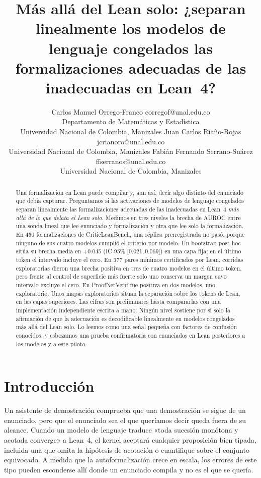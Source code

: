 \documentclass[10pt]{article}
\title{Más allá del Lean solo: ¿separan linealmente los modelos de lenguaje congelados las formalizaciones adecuadas de las inadecuadas en Lean~4?}
\author{\name Carlos Manuel Orrego-Franco \email corregof@unal.edu.co \\
      \addr Departamento de Matem\'aticas y Estad\'istica\\
      Universidad Nacional de Colombia, Manizales
      \AND
      \name Juan Carlos Ria\~no-Rojas \email jcrianoro@unal.edu.co \\
      \addr Universidad Nacional de Colombia, Manizales
      \AND
      \name Fabi\'an Fernando Serrano-Su\'arez \email ffserranos@unal.edu.co \\
      \addr Universidad Nacional de Colombia, Manizales}
\newcommand{\ic}[2]{[#1,\,#2]}
\begin{document}
\maketitle

\begin{abstract}
Una formalización en Lean puede compilar y, aun así, decir algo distinto del enunciado que debía capturar.
Preguntamos si las activaciones de modelos de lenguaje congelados separan linealmente las formalizaciones adecuadas
de las inadecuadas en Lean~4 \emph{más allá de lo que delata el Lean solo}. Medimos en tres niveles la brecha de
AUROC entre una sonda lineal que lee enunciado y formalización y otra que lee solo la formalización.
En 450 formalizaciones de CriticLeanBench, una réplica prerregistrada no pasó, porque ninguno de sus cuatro modelos
cumplió el criterio por modelo. Un bootstrap post hoc sitúa su brecha media en +0.045 (IC 95\% \ic{0.021}{0.069})
en una capa fija; en el último token el intervalo incluye el cero.
En 377 pares mínimos certificados por Lean, corridas exploratorias dieron una brecha positiva en tres de cuatro
modelos en el último token, pero frente al control de superficie más fuerte solo uno conserva un margen cuyo
intervalo excluye el cero.
En ProofNetVerif fue positiva en dos modelos, uno exploratorio.
Unos mapas exploratorios sitúan la separación sobre los tokens de Lean, en las capas superiores.
Las cifras son preliminares hasta compararlas con una implementación independiente escrita a mano.
Ningún nivel sostiene por sí solo la afirmación de que la adecuación es decodificable linealmente en modelos
congelados más allá del Lean solo. Lo leemos como una señal pequeña con factores de confusión conocidos, y
esbozamos una prueba confirmatoria con enunciados en Lean posteriores a los modelos y a este piloto.
\end{abstract}

\section{Introducción}

Un asistente de demostración comprueba que una demostración se sigue de un enunciado, pero que el enunciado sea el
que queríamos decir queda fuera de su alcance. Cuando un modelo de lenguaje traduce «toda sucesión monótona y acotada
converge» a Lean~4, el kernel aceptará cualquier proposición bien tipada, incluida una que omita la hipótesis de
acotación o cuantifique sobre el conjunto equivocado. A medida que la autoformalización crece en escala, los errores
de este tipo pueden esconderse allí donde un enunciado compila y no es el que se quería.
\end{document}

